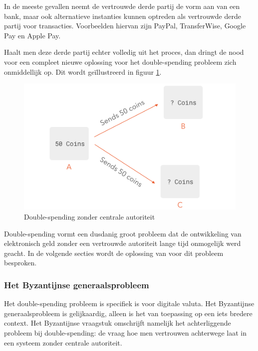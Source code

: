 			In de meeste gevallen neemt de vertrouwde derde partij de vorm aan van een bank, maar ook alternatieve instanties kunnen optreden als vertrouwde derde partij voor transacties. Voorbeelden hiervan zijn PayPal, TransferWise, Google Pay en Apple Pay.
		
			Haalt men deze derde partij echter volledig uit het proces, dan dringt de nood voor een compleet nieuwe oplossing voor het double-spending probleem zich onmiddellijk op.  Dit wordt geïllustreerd in figuur \ref{fig:double_spending1}.
			
			\begin{figure}
				\includegraphics[width=\linewidth]{img/double_spending1.png}
				\caption{Double-spending zonder centrale autoriteit}
				\label{fig:double_spending1}
			\end{figure}
		
			Double-spending vormt een dusdanig groot probleem dat  de ontwikkeling van elektronisch geld zonder een vertrouwde autoriteit lange tijd onmogelijk werd geacht. In de volgende secties wordt de oplossing van \textcite{Nakamoto2008} voor dit probleem besproken. 
			
			\subsubsection{Het Byzantijnse generaalsprobleem}
			Het double-spending probleem is specifiek is voor digitale valuta. Het Byzantijnse generaalsprobleem is gelijkaardig, alleen is het van toepassing op een iets bredere context. Het Byzantijnse vraagstuk omschrijft namelijk het achterliggende probleem bij double-spending: de vraag hoe men vertrouwen achterwege laat in een systeem zonder centrale autoriteit.
			
